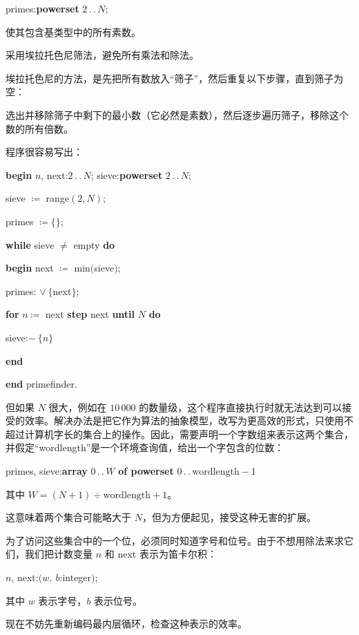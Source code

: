 \quad primes:\textbf{powerset} $2\,.\,.\,N$;

\noindent
使其包含基类型中的所有素数。

\noindent
采用埃拉托色尼筛法，避免所有乘法和除法。

埃拉托色尼的方法，是先把所有数放入“筛子”，然后重复以下步骤，直到筛子为空：

\noindent
选出并移除筛子中剩下的最小数（它必然是素数），然后逐步遍历筛子，移除这个数的所有倍数。

程序很容易写出：

\noindent
\textbf{begin} $n$, next:$2\,.\,.\,N$; sieve:\textbf{powerset} $2\,.\,.\,N$;

\noindent
\quad sieve $\coloneq$ range$(2, N)$;

\noindent
\quad primes $\coloneq \{\}$;

\noindent
\quad \textbf{while} sieve $\neq$ empty \textbf{do}

\noindent
\quad \quad \textbf{begin} next $\coloneq$ min$($sieve$)$;

\noindent
\quad \quad \quad primes: $\vee\ \{$next$\}$;

\noindent
\quad \quad \quad \textbf{for} $n\coloneq$ next \textbf{step} next \textbf{until} $N$ \textbf{do}

\noindent
\quad \quad \quad \quad sieve:$-\ \{n\}$

\noindent
\quad \quad \textbf{end}

\noindent
\textbf{end} primefinder.

但如果 $N$ 很大，例如在 $10\,000$ 的数量级，这个程序直接执行时就无法达到可以接受的效率。解决办法是把它作为算法的抽象模型，改写为更高效的形式，只使用不超过计算机字长的集合上的操作。因此，需要声明一个字数组来表示这两个集合，并假定“wordlength”是一个环境查询值，给出一个字包含的位数：

\quad primes, sieve:\textbf{array} $0\,.\,.\,W$ \textbf{of powerset} $0\,.\,.\,\text{wordlength} - 1$

\noindent
其中 $W = (N + 1) \div \text{wordlength} + 1$。

\noindent
这意味着两个集合可能略大于 $N$，但为方便起见，接受这种无害的扩展。

为了访问这些集合中的一个位，必须同时知道字号和位号。由于不想用除法来求它们，我们把计数变量 $n$ 和 next 表示为笛卡尔积：

\quad $n$, next:$(w,\ b$:integer$)$;

\noindent
其中 $w$ 表示字号，$b$ 表示位号。

现在不妨先重新编码最内层循环，检查这种表示的效率。

